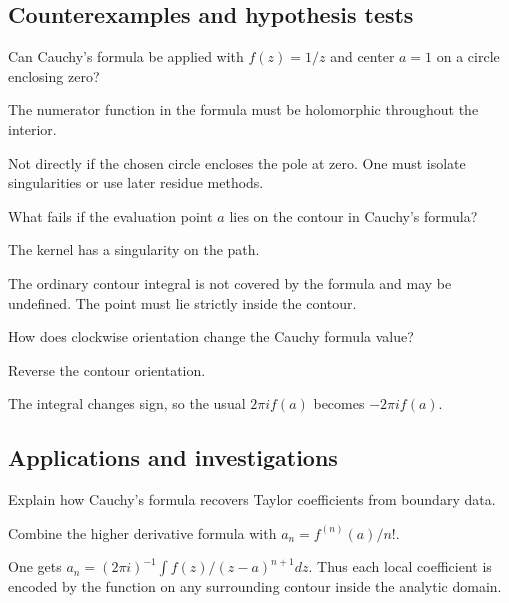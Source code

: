 \subsection*{Counterexamples and hypothesis tests}

\begin{exercise}\label{exr:iv06-expand-10}
Can Cauchy's formula be applied with \(f(z)=1/z\) and center \(a=1\) on a circle enclosing zero?
\end{exercise}
\begin{hint}
The numerator function in the formula must be holomorphic throughout the interior.
\end{hint}
\begin{solution}
Not directly if the chosen circle encloses the pole at zero. One must isolate singularities or use later residue methods.
\end{solution}

\begin{exercise}\label{exr:iv06-expand-11}
What fails if the evaluation point \(a\) lies on the contour in Cauchy's formula?
\end{exercise}
\begin{hint}
The kernel has a singularity on the path.
\end{hint}
\begin{solution}
The ordinary contour integral is not covered by the formula and may be undefined. The point must lie strictly inside the contour.
\end{solution}

\begin{exercise}\label{exr:iv06-expand-12}
How does clockwise orientation change the Cauchy formula value?
\end{exercise}
\begin{hint}
Reverse the contour orientation.
\end{hint}
\begin{solution}
The integral changes sign, so the usual \(2\pi i f(a)\) becomes \(-2\pi i f(a)\).
\end{solution}

\subsection*{Applications and investigations}

\begin{exercise}\label{exr:iv06-expand-13}
Explain how Cauchy's formula recovers Taylor coefficients from boundary data.
\end{exercise}
\begin{hint}
Combine the higher derivative formula with \(a_n=f^{(n)}(a)/n!\).
\end{hint}
\begin{solution}
One gets \(a_n=(2\pi i)^{-1}\int f(z)/(z-a)^{n+1}dz\). Thus each local coefficient is encoded by the function on any surrounding contour inside the analytic domain.
\end{solution}

